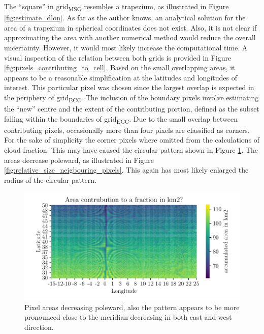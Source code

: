 The ``square'' in grid\textsubscript{MSG} resembles a trapezium, as illustrated in Figure \ref{fig:estimate_dlon}. As far as the author knows, an analytical solution for the area of a trapezium in spherical coordinates does not exist. Also, it is not clear if approximating the area with another numerical method would reduce the overall uncertainty. However, it would most likely increase the computational time. 
A visual inspection of the relation between both grids is provided in 
Figure \ref{fig:pixels_contributing_to_cell}. Based on the small overlapping areas, it appears to be a reasonable simplification at the latitudes and longitudes of interest. This particular pixel was chosen since the largest overlap is expected in the periphery of grid\textsubscript{ECC}. The inclusion of the boundary pixels involve estimating the ``new'' centre and the extent of the contributing portion, defined as the subset falling within the boundaries of grid\textsubscript{ECC}. Due to the small overlap between contributing pixels, occasionally more than four pixels are classified as corners. For the sake of simplicity the corner pixels where omitted from the calculations of cloud fraction. This may have caused the circular pattern shown in Figure \ref{fig:area_pixel_signal}. The areas decrease poleward, as illustrated in Figure \ref{fig:relative_size_neigbouring_pixels}. This again has most likely enlarged the radius of the circular pattern.
\begin{figure}[ht]
    \centering
    \includegraphics{python_figs/signal_area_pixel.pdf}
    \caption{Pixel areas decreasing poleward, also the pattern appears to be more pronounced close to the meridian decreasing in both east and west direction.}
    \label{fig:area_pixel_signal}
\end{figure} 



